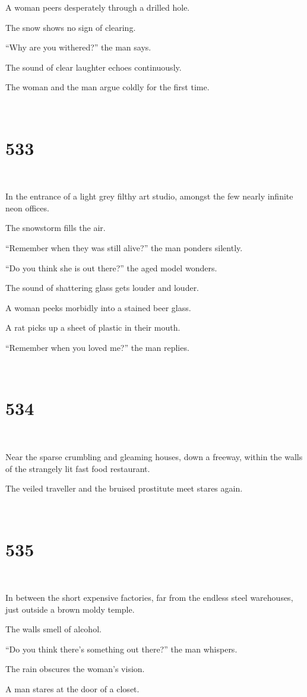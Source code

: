 \documentclass{report}
\begin{document}
A woman peers desperately through a drilled hole.

The snow shows no sign of clearing.

``Why are you withered?'' the man says.

The sound of clear laughter echoes continuously.

The woman and the man argue coldly for the first time.

~
\chapter*{533}
~

In the entrance of a light grey filthy art studio, amongst the few nearly infinite neon offices.

The snowstorm fills the air.

``Remember when they was still alive?'' the man ponders silently.

``Do you think she is out there?'' the aged model wonders.

The sound of shattering glass gets louder and louder.

A woman peeks morbidly into a stained beer glass.

A rat picks up a sheet of plastic in their mouth.

``Remember when you loved me?'' the man replies.

~
\chapter*{534}
~

Near the sparse crumbling and gleaming houses, down a freeway, within the walls of the strangely lit fast food restaurant.

The veiled traveller and the bruised prostitute meet stares again.

~
\chapter*{535}
~

In between the short expensive factories, far from the endless steel warehouses, just outside a brown moldy temple.

The walls smell of alcohol.

``Do you think there's something out there?'' the man whispers.

The rain obscures the woman's vision.

A man stares at the door of a closet.
\end{document}
